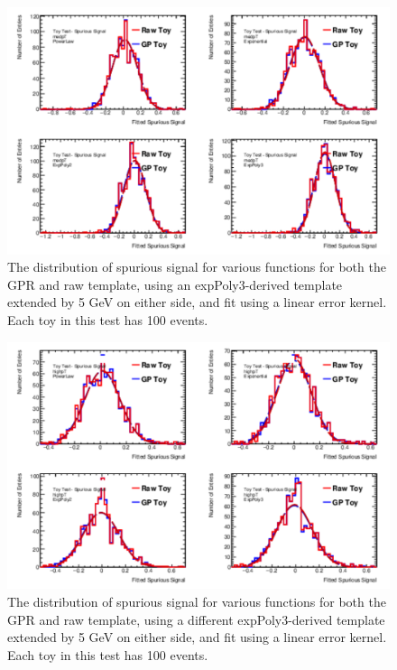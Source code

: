 \begin{figure} 
\begin{center}
  \includegraphics[width=\textwidth]{figures/background/gpr/validation/linear/ToyTest_FitSigVals_medpT_100_noSig}   
\caption{The distribution of spurious signal for various functions for both the GPR and raw template, using an expPoly3-derived template extended by 5 GeV on either side, and fit using a linear error kernel. Each toy in this test has 100 events.}
\label{fig:linearkernel_medpt_100_noSig}
\end{center}
\end{figure}

\begin{figure} 
\begin{center}
  \includegraphics[width=\textwidth]{figures/background/gpr/validation/linear/ToyTest_FitSigVals_highpT_100_noSig}   
\caption{The distribution of spurious signal for various functions for both the GPR and raw template, using a different expPoly3-derived template extended by 5 GeV on either side, and fit using a linear error kernel. Each toy in this test has 100 events.}
\label{fig:linearkernel_highpt_100_noSig}
\end{center}
\end{figure}

